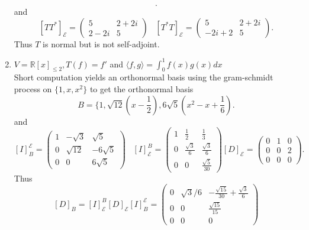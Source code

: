 \documentclass{article}
\begin{document}
\begin{enumerate}[label = (\alph*)]
\[            .\] 
            and
            \[
                [TT^{*}]_\mathcal{E} = \begin{pmatrix} 5 & 2 + 2i \\ 2 - 2i & 5 \end{pmatrix}  \;\;\; [T^{*}T]_\mathcal{E} = \begin{pmatrix} 5 & 2 + 2i \\ -2i + 2 & 5 \end{pmatrix} 
            .\] 
            Thus $T$ is normal but is not self-adjoint.
        \item $V = \mathbb{R}[x]_{\le 2}, T(f) = f'$ and $\langle f, g \rangle = \int_{0}^{1}f(x)g(x)dx$ \\
            Short computation yields an orthonormal basis using the gram-schmidt process on $\{1,x,x^2\}$ to
            get the orthonormal basis
            \[
            B = \{1, \sqrt{12}(x-\frac{1}{2}), 6\sqrt{5}(x^2-x+\frac{1}{6})
            .\] 
            and
            \[
                [I]^\mathcal{E}_{B} = \begin{pmatrix} 1 & -\sqrt{3} & \sqrt{5} \\
                    0 & \sqrt{12} & - 6\sqrt{5}\\
                    0 & 0 & 6\sqrt{5}
                \end{pmatrix} 
                \;\;\;
                [I]_\mathcal{E}^{B} = \begin{pmatrix} 
                    1 & \frac{1}{2} & \frac{1}{3}\\
                    0 & \frac{\sqrt{3}}{6} & \frac{\sqrt{3}}{6}\\
                    0 & 0 & \frac{\sqrt{5}}{30}
                \end{pmatrix} 
                [D]_\mathcal{E} = \begin{pmatrix} 
                    0 & 1 & 0\\
                    0 & 0 & 2\\
                    0 & 0 & 0
                \end{pmatrix} 
            .\] 
            Thus
            \[
                [D]_B = [I]_\mathcal{E}^{B}[D]_\mathcal{E}[I]_B^{\mathcal{E}} = \begin{pmatrix} 0 & \sqrt{3}/6 & -\frac{\sqrt{15}}{30} + \frac{\sqrt{3}}{6}\\
                    0 & 0 & \frac{\sqrt{15}}{15} \\
                    0 & 0 & 0
                \end{pmatrix} 
\]
\end{enumerate}
\end{document}
